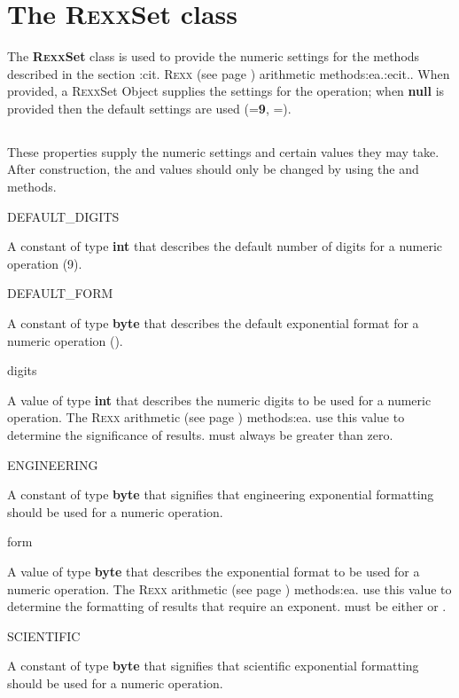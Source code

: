 \chapter{The R\textsc{exx}Set class}\label{refnlrset}
 
The \textbf{R\textsc{exx}Set} class is used to provide the numeric settings for
the methods described in the section :cit. R\textsc{exx} (see page \pageref{refrexxops}) 
arithmetic methods:ea.:ecit..
When provided, a R\textsc{exx}Set Object supplies the  settings
for the operation; when \textbf{null} is provided then the default
settings are used (=\textbf{9},
=).
\section{}\label{}
 
These properties supply the numeric settings and certain values they may
take.  After construction, the  and  values
should only be changed by using the  and
 methods.
\begin{description}
\item{DEFAULT\_DIGITS}

A constant of type \textbf{int} that describes the default number of
digits for a numeric operation (9).
\item{DEFAULT\_FORM}

A constant of type \textbf{byte} that describes the default exponential
format for a numeric operation ().
\item{digits}

A value of type \textbf{int} that describes the numeric digits to be
used for a numeric operation.  The  R\textsc{exx} arithmetic (see page \pageref{refrexxops}) 
methods:ea. use this value to determine the significance of results.
 must always be greater than zero.
\item{ENGINEERING}

A constant of type \textbf{byte} that signifies that engineering
exponential formatting should be used for a numeric operation.
\item{form}

A value of type \textbf{byte} that describes the exponential format to
be used for a numeric operation.  The  R\textsc{exx} arithmetic (see page \pageref{refrexxops}) 
methods:ea. use this value to determine the formatting of results that
require an exponent.
 must be either  or .
\item{SCIENTIFIC}

A constant of type \textbf{byte} that signifies that scientific
exponential formatting should be used for a numeric operation.
\end{description}
